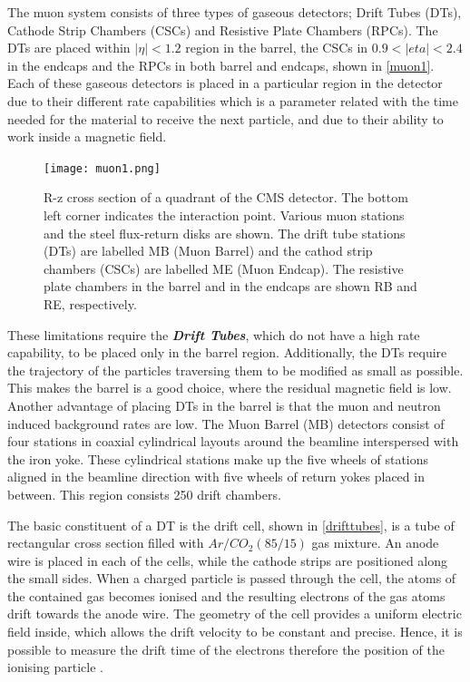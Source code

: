 The  muon system consists of three types of gaseous detectors; Drift Tubes (DTs), Cathode Strip Chambers (CSCs) and Resistive Plate Chambers (RPCs). The DTs are placed within $|\eta| < 1.2$ region in the barrel, the CSCs in $0.9<|eta|<2.4$ in the endcaps and the RPCs in both barrel and endcaps, shown in \autoref{muon1}. Each of these gaseous detectors is placed in a particular region in the detector due to their different rate capabilities which is a parameter related with the time needed for the material to receive the next particle, and due to their ability to work inside a magnetic field.

\begin{figure}[ht]
	\centering
	\texttt{[image: muon1.png]}
	\vspace{2mm}
	\caption[R-z cross section of a quadrant of the CMS detector. The bottom left corner indicates the interaction point. Various muon stations and the steel flux-return disks are shown. The drift tube stations (DTs) are labelled MB (Muon Barrel) and the cathod strip chambers (CSCs) are labelled ME (Muon Endcap). The resistive plate chambers in the barrel and in the endcaps are shown RB and RE, respectively.]{R-z cross section of a quadrant of the CMS detector. The bottom left corner indicates the interaction point. Various muon stations and the steel flux-return disks are shown. The drift tube stations (DTs) are labelled MB (Muon Barrel) and the cathod strip chambers (CSCs) are labelled ME (Muon Endcap). The resistive plate chambers in the barrel and in the endcaps are shown RB and RE, respectively\cite{muon1}.}
	\label{muon1}
\end{figure}

These limitations require the \emph{\textbf{Drift Tubes}}, which do not have a high rate capability, to be placed only in the barrel region. Additionally, the DTs require the trajectory of the particles traversing them to be modified as small as possible. This makes the barrel is a good choice, where the residual magnetic field is low. Another advantage of placing DTs in the barrel is that the muon and neutron induced background rates are low. The Muon Barrel (MB) detectors consist of four stations in coaxial cylindrical layouts around the beamline interspersed with the iron yoke. These cylindrical stations make up the five wheels of stations aligned in the beamline direction with five wheels of return yokes placed in between. This region consists 250 drift chambers.

The basic constituent of a DT is the drift cell, shown in \autoref{drifttubes}, is a tube of rectangular cross section filled with $Ar/CO_2 (85/15)$ gas mixture. An anode wire is placed in each of the cells, while the cathode strips are positioned along the small sides. When a charged particle is passed through the cell, the atoms of the contained gas becomes ionised and the resulting electrons of the gas atoms drift towards the anode wire. The geometry of the cell provides a uniform electric field inside, which allows the drift velocity to be constant and precise. Hence, it is possible to measure the drift time of the electrons therefore the position of the ionising particle \cite{Sirunyan_2018}.

